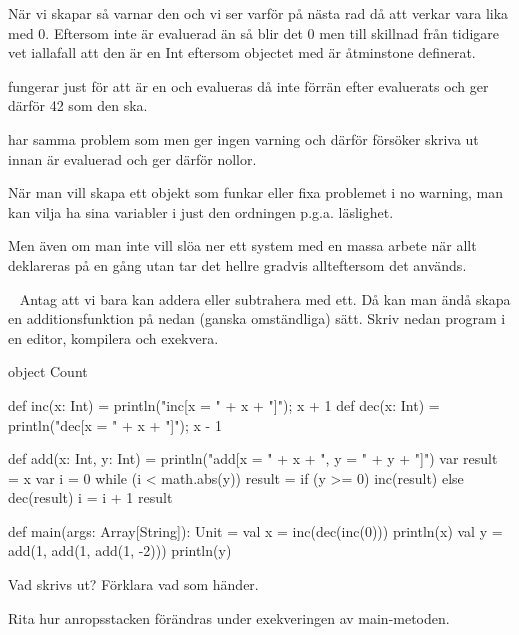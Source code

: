 När vi skapar  så varnar den och vi ser varför på nästa rad då att  verkar vara lika med 0. Eftersom  inte är evaluerad än så blir det 0 men till skillnad från tidigare vet  iallafall att den är en Int eftersom objectet med  är åtminstone definerat.

 fungerar just för att  är en  och evalueras då inte förrän efter  evaluerats och ger därför 42 som den ska.

 har samma problem som  men ger ingen varning och därför försöker skriva ut innan  är evaluerad och ger därför nollor.

\SubtaskSolved
När man vill skapa ett objekt som funkar eller fixa problemet i no warning, man kan vilja ha sina variabler i just den ordningen p.g.a. läslighet.

Men även om man inte vill slöa ner ett system med en massa arbete när allt deklareras på en gång utan tar det hellre gradvis allteftersom det används.



\QUESTEND









\QUESTBEGIN

\Task  \what~  Antag att vi bara kan addera eller subtrahera med ett. Då kan man ändå skapa en additionsfunktion på nedan (ganska omständliga) sätt. Skriv nedan program i en editor, kompilera och exekvera.
\begin{Code}
object Count {
  def inc(x: Int) = {println("inc[x = " + x + "]"); x + 1}
  def dec(x: Int) = {println("dec[x = " + x + "]"); x - 1}

  def add(x: Int, y: Int) = {
    println("add[x = " + x + ", y = " + y + "]")
    var result = x
    var i = 0
    while (i < math.abs(y)){
      result = if (y >= 0) inc(result) else dec(result)
      i = i + 1
    }
    result
  }

  def main(args: Array[String]): Unit = {
    val x =  inc(dec(inc(0)))
    println(x)
    val y = add(1, add(1, add(1, -2)))
    println(y)
  }
}
\end{Code}

\Subtask Vad skrivs ut? Förklara vad som händer.

\Subtask Rita hur anropsstacken förändras under exekveringen av main-metoden.


